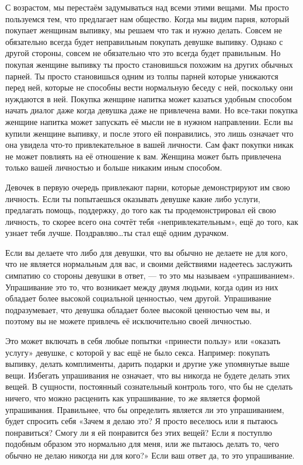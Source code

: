С возрастом, мы перестаём задумываться над всеми этими вещами. Мы просто пользуемся тем, что предлагает нам общество. Когда мы видим парня, который покупает женщинам выпивку, мы решаем что так и нужно делать. Совсем не обязательно всегда будет неправильным покупать девушке выпивку. Однако с другой стороны, совсем не обязательно что это всегда будет правильным. Но покупая женщине выпивку ты просто становишься похожим на других обычных парней. Ты просто становишься одним из толпы парней которые унижаются перед ней, которые не способны вести нормальную беседу с ней, поскольку они нуждаются в ней. Покупка женщине напитка может казаться удобным способом начать диалог даже когда девушка даже не привлечена вами. Но все-таки покупка женщине напитка может запускать её мысли не в нужном направлении. Если вы купили женщине выпивку, и после этого ей понравились, это лишь означает что она увидела что-то привлекательное в вашей личности. Сам факт покупки никак не может повлиять на её отношение к вам. Женщина может быть привлечена только вашей личностью и больше никаким иным способом.

Девочек в первую очередь привлекают парни, которые демонстрируют им свою личность. Если ты попытаешься оказывать девушке какие либо услуги, предлагать помощь, поддержку, до того как ты продемонстрировал ей свою личность, то скорее всего она сочтёт тебя «непривлекательным», ещё до того, как узнает тебя лучше. Поздравляю\ldots ты стал ещё одним дурачком.

Если вы делаете что либо для девушки, что вы обычно не делаете не для кого, что не является нормальным для вас, и своими действиями надеетесь заслужить симпатию со стороны девушки в ответ, --- то это мы называем «упрашиванием». Упрашивание это то, что возникает между двумя людьми, когда один из них обладает более высокой социальной ценностью, чем другой. Упрашивание подразумевает, что девушка обладает более высокой ценностью чем вы, и поэтому вы не можете привлечь её исключительно своей личностью.

Это может включать в себя любые попытки «принести пользу» или «оказать услугу» девушке, с которой у вас ещё не было секса. Например: покупать выпивку, делать комплименты, дарить подарки и другие уже упомянутые выше вещи. Избегать упрашивания не означает, что вы никогда не будете делать этих вещей. В сущности, постоянный сознательный контроль того, что бы не сделать ничего, что можно расценить как упрашивание, то же является формой упрашивания. Правильнее, что бы определить является ли это упрашиванием, будет спросить себя «Зачем я делаю это? Я просто веселюсь или я пытаюсь понравиться? Смогу ли я ей понравится без этих вещей? Если я поступлю подобным образом это нормально для меня, или же пытаюсь делать то, чего обычно не делаю никогда ни для кого?» Если ваш ответ да, то это упрашивание.

